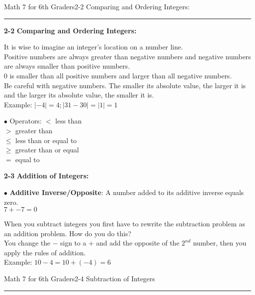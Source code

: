 \begin{enumerate*}
\newpage
\noindent\Large{Math 7 for 6th Graders\hfill 2-2 Comparing and Ordering Integers:}
\noindent\hrule
\vspace{5mm}

		\item[\Large\textbf{2-2}] \Large\textbf{Comparing and Ordering Integers:}\\
			\begin{enumerate*}
				\item[]It is wise to imagine an integer's location on a number line.\\
				Positive numbers are always greater than negative numbers and negative numbers are always smaller than positive numbers.\\
				0 is smaller than all positive numbers and larger than all negative numbers.\\
				Be careful with negative numbers. The smaller its absolute value, the larger it is and the larger its absolute value, the smaller it is.\\
				Example: $|-4|=4; |31-30|=|1|=1$\\
				\item[$\bullet$]Operators:
					$<$ less than\\ $>$ greater than\\ $\leq$ less than or equal to\\ $\geq$ greater than or equal\\ $=$ equal to\\
			\end{enumerate*}
			
		\item[\Large\textbf{2-3}] \Large\textbf{Addition of Integers:}\\
			\begin{enumerate*}
				\item[$\bullet$]\textbf{Additive Inverse/Opposite}: A number added to its additive inverse equals zero.\\
				$7+-7=0$
				\item[]When you subtract integers you first have to rewrite the subtraction problem as an addition problem. How do you do this?\\
				You change the $-$ sign to a $+$ and add the opposite of the $2^{nd}$ number, then you apply the rules of addition.\\
				Example: $10-4=10+(-4)=6$\\
			\end{enumerate*}
			
\newpage
\noindent\Large{Math 7 for 6th Graders\hfill 2-4 Subtraction of Integers}
\noindent\hrule
\vspace{5mm}
			

\end{enumerate*}
